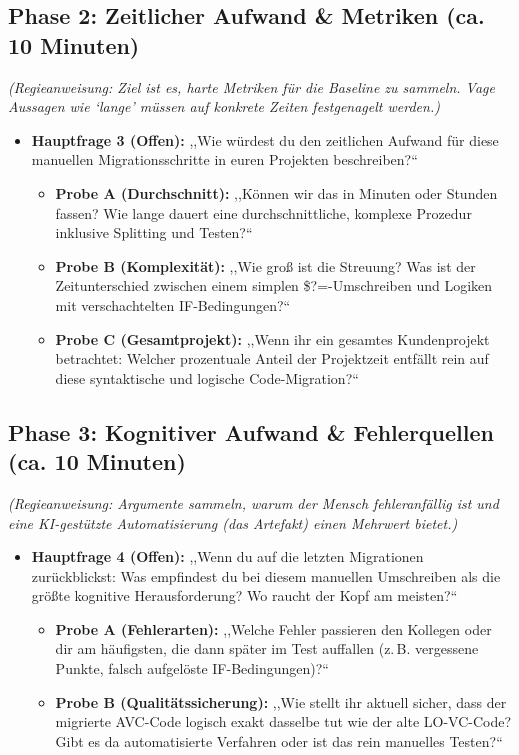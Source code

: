 \documentclass[12pt, a4paper, oneside]{book}
\begin{document}
\subsection*{Phase 2: Zeitlicher Aufwand \& Metriken (ca. 10 Minuten)}
\textit{(Regieanweisung: Ziel ist es, harte Metriken für die Baseline zu sammeln. Vage Aussagen wie `lange' müssen auf konkrete Zeiten festgenagelt werden.)}

\begin{itemize}
    \item \textbf{Hauptfrage 3 (Offen):} ,,Wie würdest du den zeitlichen Aufwand für diese manuellen Migrationsschritte in euren Projekten beschreiben?``
    \begin{itemize}
        \item \textbf{Probe A (Durchschnitt):} ,,Können wir das in Minuten oder Stunden fassen? Wie lange dauert eine durchschnittliche, komplexe Prozedur inklusive Splitting und Testen?``
        \item \textbf{Probe B (Komplexität):} ,,Wie groß ist die Streuung? Was ist der Zeitunterschied zwischen einem simplen \$?=-Umschreiben und Logiken mit verschachtelten IF-Bedingungen?``
        \item \textbf{Probe C (Gesamtprojekt):} ,,Wenn ihr ein gesamtes Kundenprojekt betrachtet: Welcher prozentuale Anteil der Projektzeit entfällt rein auf diese syntaktische und logische Code-Migration?``
    \end{itemize}
\end{itemize}

\subsection*{Phase 3: Kognitiver Aufwand \& Fehlerquellen (ca. 10 Minuten)}
\textit{(Regieanweisung: Argumente sammeln, warum der Mensch fehleranfällig ist und eine KI-gestützte Automatisierung (das Artefakt) einen Mehrwert bietet.)}

\begin{itemize}
    \item \textbf{Hauptfrage 4 (Offen):} ,,Wenn du auf die letzten Migrationen zurückblickst: Was empfindest du bei diesem manuellen Umschreiben als die größte kognitive Herausforderung? Wo raucht der Kopf am meisten?``
    \begin{itemize}
        \item \textbf{Probe A (Fehlerarten):} ,,Welche Fehler passieren den Kollegen oder dir am häufigsten, die dann später im Test auffallen (z.\,B. vergessene Punkte, falsch aufgelöste IF-Bedingungen)?``
        \item \textbf{Probe B (Qualitätssicherung):} ,,Wie stellt ihr aktuell sicher, dass der migrierte AVC-Code logisch exakt dasselbe tut wie der alte LO-VC-Code? Gibt es da automatisierte Verfahren oder ist das rein manuelles Testen?``
    \end{itemize}
\end{itemize}
\end{document}
